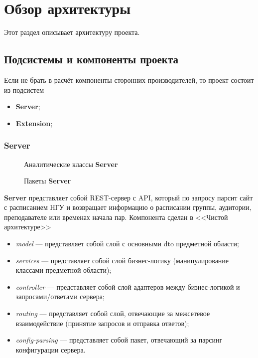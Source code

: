 \newcommand{\Server}{Server}
\newcommand{\Extension}{Extension}

\newcommand{\Serverbf}{\textbf{\Server}}
\newcommand{\Extensionbf}{\textbf{\Extension}}

\chapter{Обзор архитектуры}
	\label{chapter4}

	Этот раздел описывает архитектуру проекта.

	\section{Подсистемы и компоненты проекта}
		Если не брать в расчёт компоненты сторонних производителей, то проект состоит из подсистем
		
		\begin{itemize}
			\item \Serverbf{};
			
			\item \Extensionbf{};
		\end{itemize}
			
		\subsection{\Server{}}
			\begin{figure}[H]
				\centering
				\def\svgwidth{\columnwidth}
				
				\caption{Аналитические классы \Serverbf}
			\end{figure}
		
			\begin{figure}[H]
				\centering
				\def\svgwidth{\columnwidth}
				
				\caption{Пакеты \Serverbf}
			\end{figure}
		
			\Serverbf{} представляет собой REST-сервер с API, который по запросу парсит сайт с расписанием НГУ и возвращает информацию о расписании группы, аудитории, преподавателе или временах начала пар. Компонента сделан в <<Чистой архитектуре>>
			
			\begin{itemize}
				\item \textit{model} --- представляет собой слой с основными dto предметной области;
				
				\item \textit{services} --- представляет собой слой бизнес-логику (манипулирование классами предметной области);
				
				\item \textit{controller} --- представляет собой слой адаптеров между бизнес-логикой и запросами/ответами сервера;
				
				\item \textit{routing} --- представляет собой слой, отвечающие за межсетевое взаимодействие (принятие запросов и отправка ответов);
				
				\item \textit{config-parsing} --- представляет собой пакет, отвечающий за парсинг конфигурации сервера.
			\end{itemize}
			
